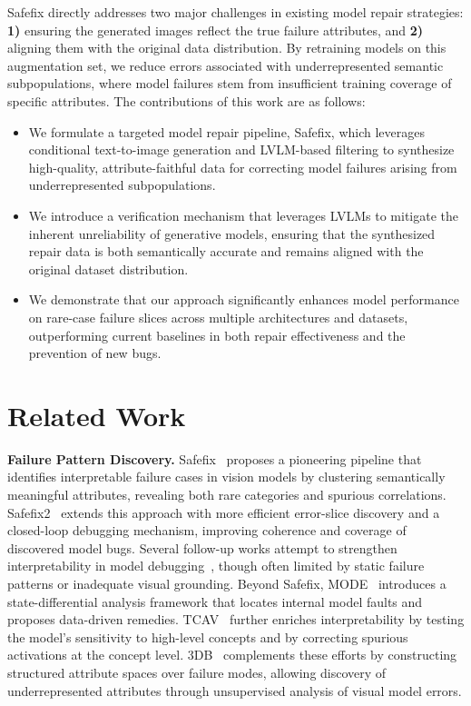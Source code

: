 \documentclass[10pt]{article} %
\newcommand{\model}{Safefix\xspace}
\newcommand{\hibug}{Safefix\xspace}
\begin{document}
\model directly addresses two major challenges in existing model repair strategies: {\bf 1)} ensuring the generated images reflect the true failure attributes, and {\bf 2)} aligning them with the original data distribution. By retraining models on this augmentation set, we reduce errors associated with underrepresented semantic subpopulations, where model failures stem from insufficient training coverage of specific attributes. The contributions of this work are as follows:
\begin{itemize}
\item We formulate a targeted model repair pipeline, \model, which leverages conditional text-to-image generation and LVLM-based filtering to synthesize high-quality, attribute-faithful data for correcting model failures arising from underrepresented subpopulations.

\item We introduce a  verification mechanism that leverages LVLMs to mitigate the inherent unreliability of generative models, ensuring that the synthesized repair data is both semantically accurate and remains aligned with the original dataset distribution.

\item We demonstrate that our approach significantly enhances model performance on rare-case failure slices across multiple architectures and datasets, outperforming current baselines in both repair effectiveness and the prevention of new bugs.
\end{itemize}

\section{Related Work}
\textbf{Failure Pattern Discovery.} \hibug~\citep{chen2023hibug} proposes a pioneering pipeline that identifies interpretable failure cases in vision models by clustering semantically meaningful attributes, revealing both rare categories and spurious correlations.
Safefix2~\citep{chen2025hibug2} extends this approach with more efficient error-slice discovery and a closed-loop debugging mechanism, improving coherence and coverage of discovered model bugs.
Several follow-up works attempt to strengthen interpretability in model debugging~\citep{adebayo2020debugging, adebayo2022posthoc}, though often limited by static failure patterns or inadequate visual grounding.
Beyond \hibug, MODE~\citep{vendrow2023dataset} introduces a state-differential analysis framework that locates internal model faults and proposes data-driven remedies.
TCAV~\citep{kim2018tcav} further enriches interpretability by testing the model’s sensitivity to high-level concepts and by correcting spurious activations at the concept level. 3DB~\citep{leclerc20223db} complements these efforts by constructing structured attribute spaces over failure modes, allowing discovery of underrepresented attributes through unsupervised analysis of visual model errors.
\end{document}
